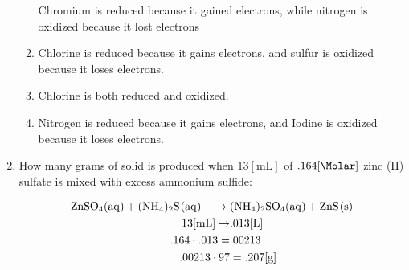 \documentclass[12pt]{article}
\begin{document}
\begin{enumerate}
\begin{enumerate}
         \begin{justify}

           Chromium is reduced because it gained electrons, while nitrogen is oxidized because it lost electrons

         \end{justify}

       \item {}

         \begin{justify}

           Chlorine is reduced because it gains electrons, and sulfur is oxidized because it loses electrons.

         \end{justify}

       \item {}

         \begin{justify}

           Chlorine is both reduced and oxidized.

         \end{justify}

       \item {}

         \begin{justify}

           Nitrogen is reduced because it gains electrons, and Iodine is oxidized because it loses electrons.

         \end{justify}

   \end{enumerate}

  \item How many grams of solid is produced when $13[\si{\milli\liter}]$ of $.164[\si{\Molar}]$ zinc (II) sulfate is mixed with excess ammonium sulfide:

    \begin{equation}
      \begin{split}
        \ce{ZnSO4(aq) + (NH4)2S(aq) ->} & \ce{(NH4)2SO4(aq) + ZnS(s)}\\
        13[\si{\milli\liter}] \rightarrow & .013[\si{\liter}]\\
        .164\cdot.013=&.00213\\
        .00213\cdot97&=.207[\si{\gram}]
      \end{split}
      \label{2}
    \end{equation}


\end{enumerate}
\end{document}
